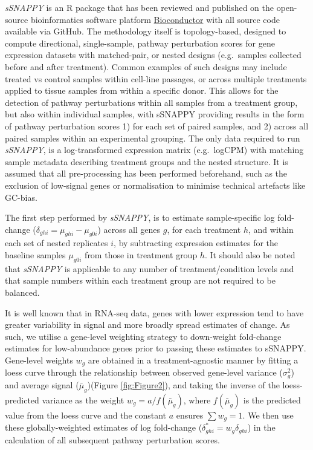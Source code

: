 \documentclass[9pt,a4paper,]{extarticle}
\begin{document}
\emph{sSNAPPY} is an R package that has been reviewed and published on the open-source bioinformatics software platform \href{https://bioconductor.org/packages/release/bioc/html/*sSNAPPY*.html}{Bioconductor} with all source code available via GitHub.
The methodology itself is topology-based, designed to compute directional, single-sample, pathway perturbation scores for gene expression datasets with matched-pair, or nested designs (e.g.~samples collected before and after treatment).
Common examples of such designs may include treated vs control samples within cell-line passages, or across multiple treatments applied to tissue samples from within a specific donor.
This allows for the detection of pathway perturbations within all samples from a treatment group, but also within individual samples, with sSNAPPY providing results in the form of pathway perturbation scores 1) for each set of paired samples, and 2) across all paired samples within an experimental grouping.
The only data required to run \emph{sSNAPPY}, is a log-transformed expression matrix (e.g.~logCPM) with matching sample metadata describing treatment groups and the nested structure.
It is assumed that all pre-processing has been performed beforehand, such as the exclusion of low-signal genes or normalisation to minimise technical artefacts like GC-bias.

The first step performed by \emph{sSNAPPY}, is to estimate sample-specific log fold-change (\(\delta_{ghi} = \mu_{ghi} - \mu_{g0i}\)) across all genes \(g\), for each treatment \(h\), and within each set of nested replicates \(i\), by subtracting expression estimates for the baseline samples \(\mu_{g0i}\) from those in treatment group \(h\).
It should also be noted that \emph{sSNAPPY} is applicable to any number of treatment/condition levels and that sample numbers within each treatment group are not required to be balanced.

It is well known that in RNA-seq data, genes with lower expression tend to have greater variability in signal and more broadly spread estimates of change\citep{Law2014}.
As such, we utilise a gene-level weighting strategy to down-weight fold-change estimates for low-abundance genes prior to passing these estimates to sSNAPPY.
Gene-level weights \(w_g\) are obtained in a treatment-agnostic manner by fitting a loess curve through the relationship between observed gene-level variance (\(\sigma^2_g\)) and average signal (\(\bar\mu_{g}\))(Figure \ref{fig:Figure2}), and taking the inverse of the loess-predicted variance as the weight \(w_g = a / f(\bar\mu_{g})\), where \(f(\bar\mu_{g})\) is the predicted value from the loess curve and the constant \(a\) ensures \(\sum w_g = 1\).
We then use these globally-weighted estimates of log fold-change (\(\delta_{ghi}^* = w_g\delta_{ghi}\)) in the calculation of all subsequent pathway perturbation scores.
\end{document}

